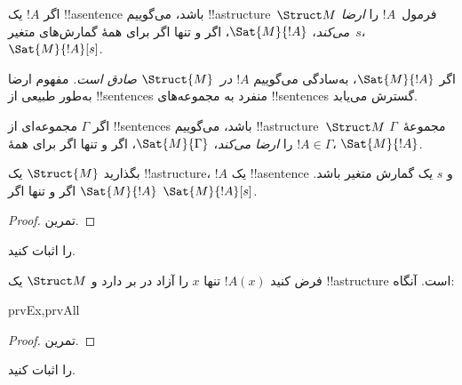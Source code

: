 \documentclass[../../../include/open-logic-section]{subfiles}
\begin{document}
\begin{defn}
اگر $!A$ یک !!a{sentence} باشد، می‌گوییم !!a{structure}~$\Struct M$
فرمول~$!A$ را \emph{ارضا می‌کند}، $\Sat{M}{!A}$، اگر و تنها اگر برای همهٔ
گمارش‌های متغیر~$s$، $\Sat{M}{!A}[s]$.
\end{defn}

اگر $\Sat{M}{!A}$، به‌سادگی می‌گوییم \emph{$!A$ در~$\Struct{M}$ صادق
است.} مفهوم ارضا به‌طور طبیعی از !!{sentence}s منفرد به مجموعه‌های
!!{sentence}s گسترش می‌یابد.

\begin{defn}
اگر $\Gamma$ مجموعه‌ای از !!{sentence}s باشد، می‌گوییم
!!a{structure}~$\Struct M$ مجموعهٔ~$\Gamma$ را \emph{ارضا می‌کند}،
$\Sat{M}{\Gamma}$، اگر و تنها اگر برای همهٔ $!A \in \Gamma$،
$\Sat{M}{!A}$.
\end{defn}

\begin{prop}
  بگذارید $\Struct{M}$ یک !!a{structure}، $!A$ یک !!a{sentence} و $s$
  یک گمارش متغیر باشد. $\Sat{M}{!A}$ اگر و تنها اگر
  $\Sat{M}{!A}[s]$.
\end{prop}

\begin{proof}
تمرین.
\end{proof}

\begin{prob}
 را اثبات کنید.
\end{prob}

\begin{prop}
  فرض کنید $!A(x)$ تنها $x$ را آزاد در بر دارد و $\Struct M$ یک
  !!a{structure} است. آنگاه:
  \begin{tagenumerate}{prvEx,prvAll}
\end{tagenumerate}
\end{prop}

\begin{proof}
تمرین.
\end{proof}

\begin{prob}
 را اثبات کنید.
\end{prob}
\end{document}

